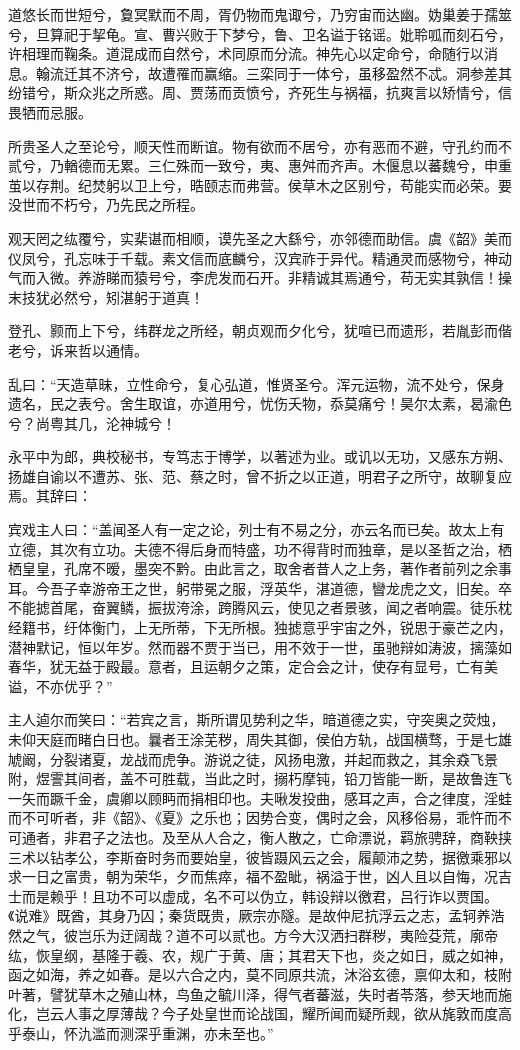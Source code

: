 \documentclass[]{article}
\begin{document}
道悠长而世短兮，敻冥默而不周，胥仍物而鬼诹兮，乃穷宙而达幽。妫巢姜于孺筮兮，旦算祀于挈龟。宣、曹兴败于下梦兮，鲁、卫名谥于铭谣。妣聆呱而刻石兮，许相理而鞠条。道混成而自然兮，术同原而分流。神先心以定命兮，命随行以消息。翰流迁其不济兮，故遭罹而赢缩。三栾同于一体兮，虽移盈然不忒。洞参差其纷错兮，斯众兆之所惑。周、贾荡而贡愤兮，齐死生与祸福，抗爽言以矫情兮，信畏牺而忌服。

所贵圣人之至论兮，顺天性而断谊。物有欲而不居兮，亦有恶而不避，守孔约而不贰兮，乃輶德而无累。三仁殊而一致兮，夷、惠舛而齐声。木偃息以蕃魏兮，申重茧以存荆。纪焚躬以卫上兮，晧颐志而弗营。侯草木之区别兮，苟能实而必荣。要没世而不朽兮，乃先民之所程。

观天罔之纮覆兮，实棐谌而相顺，谟先圣之大繇兮，亦邻德而助信。虞《韶》美而仪凤兮，孔忘味于千载。素文信而底麟兮，汉宾祚于异代。精通灵而感物兮，神动气而入微。养游睇而猿号兮，李虎发而石开。非精诚其焉通兮，苟无实其孰信！操末技犹必然兮，矧湛躬于道真！

登孔、颢而上下兮，纬群龙之所经，朝贞观而夕化兮，犹喧已而遗形，若胤彭而偕老兮，诉来哲以通情。

乱曰：``天造草昧，立性命兮，复心弘道，惟贤圣兮。浑元运物，流不处兮，保身遗名，民之表兮。舍生取谊，亦道用兮，忧伤夭物，忝莫痛兮！昊尔太素，曷渝色兮？尚粤其几，沦神城兮！

永平中为郎，典校秘书，专笃志于博学，以著述为业。或讥以无功，又感东方朔、扬雄自谕以不遭苏、张、范、蔡之时，曾不折之以正道，明君子之所守，故聊复应焉。其辞曰：

宾戏主人曰：``盖闻圣人有一定之论，列士有不易之分，亦云名而已矣。故太上有立德，其次有立功。夫德不得后身而特盛，功不得背时而独章，是以圣哲之治，栖栖皇皇，孔席不暧，墨突不黔。由此言之，取舍者昔人之上务，著作者前列之余事耳。今吾子幸游帝王之世，躬带冕之服，浮英华，湛道德，矕龙虎之文，旧矣。卒不能摅首尾，奋翼鳞，振拔洿涂，跨腾风云，使见之者景骇，闻之者响震。徒乐枕经籍书，纡体衡门，上无所蒂，下无所根。独摅意乎宇宙之外，锐思于豪芒之内，潜神默记，恒以年岁。然而器不贾于当已，用不效于一世，虽驰辩如涛波，摛藻如春华，犹无益于殿最。意者，且运朝夕之策，定合会之计，使存有显号，亡有美谥，不亦优乎？''

主人逌尔而笑曰：``若宾之言，斯所谓见势利之华，暗道德之实，守突奥之荧烛，未仰天庭而睹白日也。曩者王涂芜秽，周失其御，侯伯方轨，战国横骛，于是七雄虓阚，分裂诸夏，龙战而虎争。游说之徒，风扬电激，并起而救之，其余猋飞景附，煜霅其间者，盖不可胜载，当此之时，搦朽摩钝，铅刀皆能一断，是故鲁连飞一矢而蹶千金，虞卿以顾眄而捐相印也。夫啾发投曲，感耳之声，合之律度，淫蛙而不可听者，非《韶》、《夏》之乐也；因势合变，偶时之会，风移俗易，乖忤而不可通者，非君子之法也。及至从人合之，衡人散之，亡命漂说，羁旅骋辞，商鞅挟三术以钻孝公，李斯奋时务而要始皇，彼皆蹑风云之会，履颠沛之势，据徼乘邪以求一日之富贵，朝为荣华，夕而焦瘁，福不盈眦，祸溢于世，凶人且以自悔，况吉士而是赖乎！且功不可以虚成，名不可以伪立，韩设辩以徼君，吕行诈以贾国。《说难》既酋，其身乃囚；秦货既贵，厥宗亦隧。是故仲尼抗浮云之志，孟轲养浩然之气，彼岂乐为迂阔哉？道不可以贰也。方今大汉洒扫群秽，夷险芟荒，廓帝纮，恢皇纲，基隆于羲、农，规广于黄、唐；其君天下也，炎之如日，威之如神，函之如海，养之如春。是以六合之内，莫不同原共流，沐浴玄德，禀仰太和，枝附叶著，譬犹草木之殖山林，鸟鱼之毓川泽，得气者蕃滋，失时者苓落，参天地而施化，岂云人事之厚薄哉？今子处皇世而论战国，耀所闻而疑所觌，欲从旄敦而度高乎泰山，怀氿滥而测深乎重渊，亦未至也。''
\end{document}
